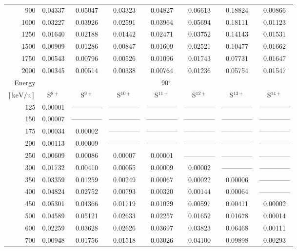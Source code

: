 \begin{table}[ht]
\begin{tabular}{r|c|c|c|c|c|c|c}
      900 & 0.04337 & 0.05047 & 0.03323 & 0.04827 & 0.06613 & 0.18824 & 0.00866 \\
     1000 & 0.03227 & 0.03926 & 0.02591 & 0.03964 & 0.05694 & 0.18111 & 0.01123 \\
     1250 & 0.01640 & 0.02188 & 0.01442 & 0.02471 & 0.03752 & 0.14143 & 0.01531 \\
     1500 & 0.00909 & 0.01286 & 0.00847 & 0.01609 & 0.02521 & 0.10477 & 0.01662 \\
     1750 & 0.00543 & 0.00796 & 0.00526 & 0.01096 & 0.01743 & 0.07731 & 0.01647 \\
     2000 & 0.00345 & 0.00514 & 0.00338 & 0.00764 & 0.01236 & 0.05754 & 0.01547 \\ \cline{1-8}
    Energy & \multicolumn{7}{c}{90$^\circ$} \\ \cline{2-8}
    $\mathrm{[keV/u]}$ & S$^{8+}$ & S$^{9+}$ & S$^{10+}$ & S$^{11+}$ & S$^{12+}$ & S$^{13+}$ & S$^{14+}$ \\ \cline{1-8}
      125 & 0.00001 & -------------- & -------------- & -------------- & -------------- & -------------- & -------------- \\
      150 & 0.00007 & -------------- & -------------- & -------------- & -------------- & -------------- & -------------- \\
      175 & 0.00034 & 0.00002 & -------------- & -------------- & -------------- & -------------- & -------------- \\
      200 & 0.00113 & 0.00009 & -------------- & -------------- & -------------- & -------------- & -------------- \\
      250 & 0.00609 & 0.00086 & 0.00007 & 0.00001 & -------------- & -------------- & -------------- \\
      300 & 0.01732 & 0.00410 & 0.00055 & 0.00009 & 0.00002 & -------------- & -------------- \\
      350 & 0.03359 & 0.01259 & 0.00249 & 0.00067 & 0.00022 & 0.00006 & -------------- \\
      400 & 0.04824 & 0.02752 & 0.00793 & 0.00320 & 0.00144 & 0.00064 & -------------- \\
      450 & 0.05301 & 0.04366 & 0.01719 & 0.01029 & 0.00597 & 0.00411 & 0.00002 \\
      500 & 0.04589 & 0.05121 & 0.02633 & 0.02257 & 0.01652 & 0.01678 & 0.00014 \\
      600 & 0.02259 & 0.03628 & 0.02626 & 0.03697 & 0.03823 & 0.06468 & 0.00111 \\
      700 & 0.00948 & 0.01756 & 0.01518 & 0.03026 & 0.04100 & 0.09898 & 0.00293 \\

\end{tabular}
\end{table}
